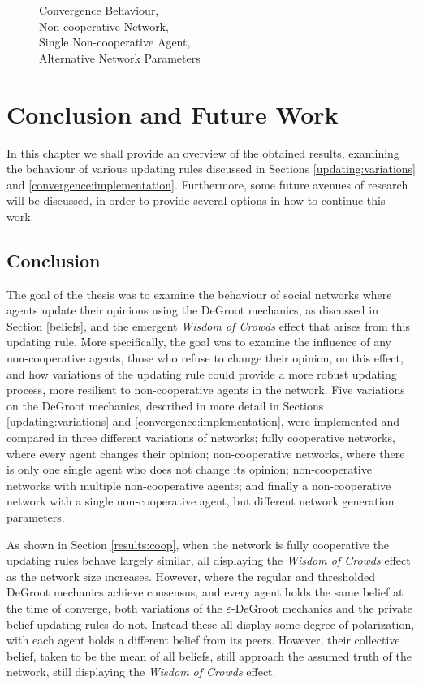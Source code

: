 \documentclass[a4paper, 12pt]{report}
\begin{document}
\begin{figure}[!htbp]
    \caption{Convergence Behaviour, \\ Non-cooperative Network, \\ Single Non-cooperative Agent, \\ Alternative Network Parameters}
\end{figure}

\newpage

\chapter{Conclusion and Future Work}
\label{chapter:conclusion}
In this chapter we shall provide an overview of the obtained results, examining the behaviour of various updating rules discussed in Sections \ref{updating:variations} and \ref{convergence:implementation}. Furthermore, some future avenues of research will be discussed, in order to provide several options in how to continue this work.

\section{Conclusion}

The goal of the thesis was to examine the behaviour of social networks where agents update their opinions using the DeGroot mechanics, as discussed in Section \ref{beliefs}, and the emergent \emph{Wisdom of Crowds} effect that arises from this updating rule. More specifically, the goal was to examine the influence of any non-cooperative agents, those who refuse to change their opinion, on this effect, and how variations of the updating rule could provide a more robust updating process, more resilient to non-cooperative agents in the network. Five variations on the DeGroot mechanics, described in more detail in Sections \ref{updating:variations} and \ref{convergence:implementation}, were implemented and compared in three different variations of networks; fully cooperative networks, where every agent changes their opinion; non-cooperative networks, where there is only one single agent who does not change its opinion; non-cooperative networks with multiple non-cooperative agents; and finally a non-cooperative network with a single non-cooperative agent, but different network generation parameters.

\noindent As shown in Section \ref{results:coop}, when the network is fully cooperative the updating rules behave largely similar, all displaying the \emph{Wisdom of Crowds} effect as the network size increases. However, where the regular and thresholded DeGroot mechanics achieve consensus, and every agent holds the same belief at the time of converge, both variations of the $\varepsilon$-DeGroot mechanics and the private belief updating rules do not. Instead these all display some degree of polarization, with each agent holds a different belief from its peers. However, their collective belief, taken to be the mean of all beliefs, still approach the assumed truth of the network, still displaying the \emph{Wisdom of Crowds} effect.
\end{document}
